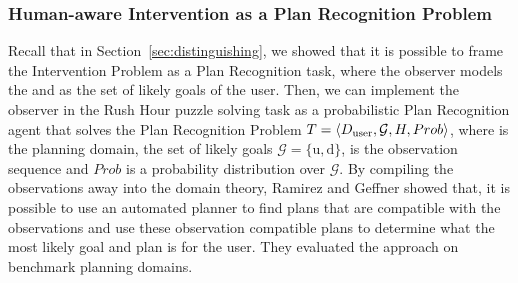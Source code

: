 \begin{table}[pbt]
%
\caption{Precision, Recall and F-scores for the prediction accuracy of the Human-aware Intervention learned models. Best values are in bold.}
\label{tab:rupsraccuracy}
\end{table}



\subsubsection{Human-aware Intervention as a Plan Recognition Problem}
Recall that in Section~\ref{sec:distinguishing}, we showed that it is possible to frame the Intervention Problem as a Plan Recognition task, where the observer models the \undesired and \desired as the set of likely goals of the user.
Then, we can implement the observer in the Rush Hour puzzle solving task as a probabilistic Plan Recognition agent that solves the Plan Recognition Problem $T=\langle D_{\textnormal{user}}, \mathcal{G}, H, Prob \rangle$, where \domainUser is the planning domain, the set of likely goals $\mathcal{G}=\lbrace \mathrm{u},\mathrm{d}\rbrace$, \historyDef is the observation sequence and $Prob$ is a probability distribution over $\mathcal{G}$. 
By compiling the observations away into the domain theory, Ramirez and Geffner showed that, it is possible to use an automated planner to find plans that are compatible with the observations and use these observation compatible plans to determine what the most likely goal and plan \cite{ramirez2010probabilistic} is for the user. 
They evaluated the approach on benchmark planning domains.

